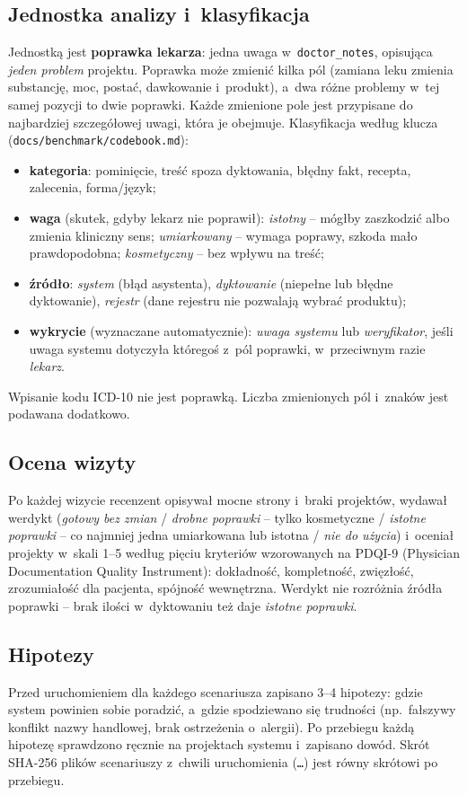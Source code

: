 \documentclass[11pt,a4paper]{article}
\begin{document}
\subsection{Jednostka analizy i~klasyfikacja}
Jednostką jest \textbf{poprawka lekarza}: jedna uwaga w~\texttt{doctor\_notes}, opisująca \emph{jeden problem} projektu.
Poprawka może zmienić kilka pól (zamiana leku zmienia substancję, moc, postać, dawkowanie i~produkt), a~dwa różne problemy
w~tej samej pozycji to dwie poprawki. Każde zmienione pole jest przypisane do najbardziej szczegółowej uwagi, która je obejmuje.
Klasyfikacja według klucza (\texttt{docs/benchmark/codebook.md}):
\begin{itemize}[nosep]
  \item \textbf{kategoria}: pominięcie, treść spoza dyktowania, błędny fakt, recepta, zalecenia, forma/język;
  \item \textbf{waga} (skutek, gdyby lekarz nie poprawił): \emph{istotny} -- mógłby zaszkodzić albo zmienia kliniczny sens;
        \emph{umiarkowany} -- wymaga poprawy, szkoda mało prawdopodobna; \emph{kosmetyczny} -- bez wpływu na treść;
  \item \textbf{źródło}: \emph{system} (błąd asystenta), \emph{dyktowanie} (niepełne lub błędne dyktowanie),
        \emph{rejestr} (dane rejestru nie pozwalają wybrać produktu);
  \item \textbf{wykrycie} (wyznaczane automatycznie): \emph{uwaga systemu} lub \emph{weryfikator}, jeśli uwaga systemu
        dotyczyła któregoś z~pól poprawki, w~przeciwnym razie \emph{lekarz}.
\end{itemize}
Wpisanie kodu ICD-10 nie jest poprawką. Liczba zmienionych pól i~znaków jest podawana dodatkowo.

\subsection{Ocena wizyty}
Po każdej wizycie recenzent opisywał mocne strony i~braki projektów, wydawał werdykt
(\emph{gotowy bez zmian} / \emph{drobne poprawki} -- tylko kosmetyczne / \emph{istotne poprawki} -- co najmniej jedna
umiarkowana lub istotna / \emph{nie do użycia}) i~oceniał projekty w~skali 1--5 według pięciu kryteriów wzorowanych na
PDQI-9 (Physician Documentation Quality Instrument): dokładność, kompletność, zwięzłość, zrozumiałość dla pacjenta, spójność wewnętrzna.
Werdykt nie rozróżnia źródła poprawki -- brak ilości w~dyktowaniu też daje \emph{istotne poprawki}.

\subsection{Hipotezy}
Przed uruchomieniem dla każdego scenariusza zapisano 3--4 hipotezy: gdzie system powinien sobie poradzić, a~gdzie
spodziewano się trudności (np.\ fałszywy konflikt nazwy handlowej, brak ostrzeżenia o~alergii). Po przebiegu każdą hipotezę
sprawdzono ręcznie na projektach systemu i~zapisano dowód. Skrót SHA-256 plików scenariuszy z~chwili uruchomienia
(\texttt{\runFingerprint\ldots}) jest równy skrótowi po przebiegu.
\end{document}
